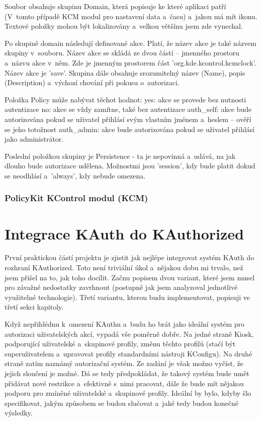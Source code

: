 Soubor obsahuje skupinu Domain, která popisuje ke které aplikaci patří (V~tomto
případě KCM modul pro nastavení data a~času) a~jakou má mít ikonu. Textové
položky mohou být lokalizovány a~velkou většínu jsem zde vynechal.

Po skupině domain následují definované akce. Platí, že název akce je také názvem
skupiny v~souboru. Název akce se skládá ze dvou částí -- jmenného prostoru
a~názvu akce v~něm. Zde je jmenným prostorem část 'org.kde.kcontrol.kcmclock'.
Název akce je 'save'. Skupina dále obsahuje srozumitelný název (Name), popis
(Description) a~výchozí chování při pokusu o~autorizaci.

Položka Policy může nabývat těchot hodnot:
yes: akce se provede bez nutnosti autentizace
no: akce se vždy zamítne, také bez autentizace
auth\_self: akce bude autorizována pokud se uživatel přihlásí svým vlastním
jménem a~heslem -- ověří se jeho totožnost
auth\_admin: akce bude autorizována pokud se uživatel přihlásí jako administrátor.

Poslední položkou skupiny je Persistence - ta je nepovinná a~udává, na jak
dlouho bude autorizace udělena. Možnostmi jsou 'session', kdy bude platit dokud
se neodhlásí a~'always', kdy nebude omezena.


\subsection{PolicyKit KControl modul (KCM)}


\chapter{Integrace KAuth do KAuthorized}
První praktickou částí projektu je zjistit jak nejlépe integrovat systém KAuth
do rozhraní KAuthorized. Toto není triviální úkol a~nějakou dobu mi trvalo, než
jsem přišel na to, jak toho docílit. Začnu popisem dvou variant, které jsem
musel pro závažné nedostatky zavrhnout (postupně jak jsem analyzoval jednotlivé 
využitelné technologie). Třetí variantu, kterou budu implementovat, popisuji
ve třetí sekci kapitoly.

Když nepřihlédnu k~omezení KAuthu a~budu ho brát jako ideální systém pro
autorizaci uživatelských akcí, vypadá vše poměrně dobře.
Na jedné straně Kiosk, podporující uživatelské a~skupinové profily, změnu
těchto profilů (stačí být superuživatelem a~upravovat profily standardními
nástroji KConfigu).
Na druhé straně zatím naznámý autorizační systém. Ze zadání je však možno
vyčíst, že jejich sloučení je možné. Dá se tedy předpokládat, že takový systém
bude umět přidávat nové restrikce a~efektivně s~nimi pracovat, dále že bude mít
nějakou podporu pro zmíněné uživatelské a~skupinové profily. Ideální by bylo,
kdyby šlo specifikovat, jakým způsobem se budou slučovat a~jaké tedy budou
konečné výsledky.


